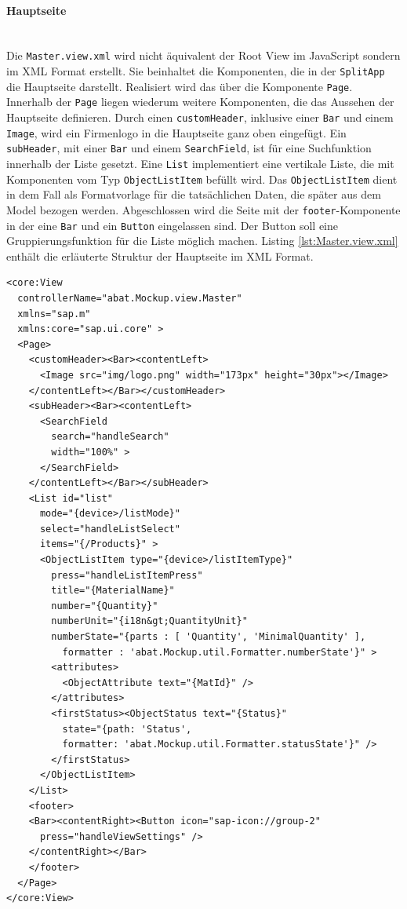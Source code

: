 \paragraph{Hauptseite}$\;$ \\
Die \texttt{Master.view.xml} wird nicht äquivalent der Root View im JavaScript sondern im XML Format erstellt. Sie beinhaltet die Komponenten, die in der \texttt{SplitApp} die Hauptseite darstellt. Realisiert wird das über die Komponente \texttt{Page}. Innerhalb der \texttt{Page} liegen wiederum weitere Komponenten, die das Aussehen der Hauptseite definieren. Durch einen \texttt{customHeader}, inklusive einer \texttt{Bar} und einem \texttt{Image}, wird ein Firmenlogo in die Hauptseite ganz oben eingefügt. Ein \texttt{subHeader}, mit einer \texttt{Bar} und einem \texttt{SearchField}, ist für eine Suchfunktion innerhalb der Liste gesetzt. Eine \texttt{List} implementiert eine vertikale Liste, die mit Komponenten vom Typ \texttt{ObjectListItem} befüllt wird. Das \texttt{ObjectListItem} dient in dem Fall als Formatvorlage für die tatsächlichen Daten, die später aus dem Model bezogen werden. Abgeschlossen wird die Seite mit der \texttt{footer}-Komponente in der eine \texttt{Bar} und ein \texttt{Button} eingelassen sind. Der Button soll eine Gruppierungsfunktion für die Liste möglich machen. Listing \ref{lst:Master.view.xml} enthält die erläuterte Struktur der Hauptseite im XML Format.

\vspace{1em}
\begin{lstlisting}[language=HTML5, caption=Hauptseite der SplitApp, label=lst:Master.view.xml]
<core:View
  controllerName="abat.Mockup.view.Master"
  xmlns="sap.m"
  xmlns:core="sap.ui.core" >
  <Page>
    <customHeader><Bar><contentLeft>
      <Image src="img/logo.png" width="173px" height="30px"></Image>
    </contentLeft></Bar></customHeader>
    <subHeader><Bar><contentLeft>
      <SearchField
        search="handleSearch"
        width="100%" >
      </SearchField>
    </contentLeft></Bar></subHeader>
    <List id="list"
      mode="{device>/listMode}"
      select="handleListSelect"
      items="{/Products}" >
      <ObjectListItem type="{device>/listItemType}"
        press="handleListItemPress"
        title="{MaterialName}"
        number="{Quantity}"
        numberUnit="{i18n&gt;QuantityUnit}"
        numberState="{parts : [ 'Quantity', 'MinimalQuantity' ],
          formatter : 'abat.Mockup.util.Formatter.numberState'}" >
        <attributes>
          <ObjectAttribute text="{MatId}" />
        </attributes>
        <firstStatus><ObjectStatus text="{Status}"
          state="{path: 'Status',
          formatter: 'abat.Mockup.util.Formatter.statusState'}" />
        </firstStatus>
      </ObjectListItem>
    </List>
    <footer>
    <Bar><contentRight><Button icon="sap-icon://group-2"
      press="handleViewSettings" />
    </contentRight></Bar>
    </footer>
  </Page>
</core:View>
\end{lstlisting}


